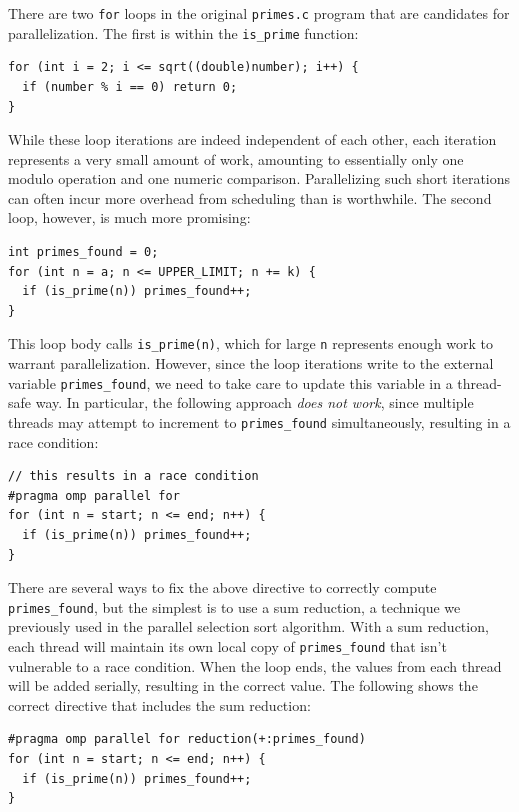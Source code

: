 \documentclass{article}
\theoremstyle{definition}
\begin{document}
There are two \texttt{for} loops in the original \texttt{primes.c} program that are candidates for parallelization. The first is within the \texttt{is\_prime} function:

\begin{verbatim}
for (int i = 2; i <= sqrt((double)number); i++) {
  if (number % i == 0) return 0;
}
\end{verbatim}

While these loop iterations are indeed independent of each other, each iteration represents a very small amount of work, amounting to essentially only one modulo operation and one numeric comparison. Parallelizing such short iterations can often incur more overhead from scheduling than is worthwhile. The second loop, however, is much more promising:

\begin{verbatim}
int primes_found = 0;
for (int n = a; n <= UPPER_LIMIT; n += k) {
  if (is_prime(n)) primes_found++;
}
\end{verbatim}

This loop body calls \texttt{is\_prime(n)}, which for large \texttt{n} represents enough work to warrant parallelization. However, since the loop iterations write to the external variable \texttt{primes\_found}, we need to take care to update this variable in a thread-safe way. In particular, the following approach \emph{does not work}, since multiple threads may attempt to increment to \texttt{primes\_found} simultaneously, resulting in a race condition:

\begin{verbatim}
// this results in a race condition
#pragma omp parallel for
for (int n = start; n <= end; n++) {
  if (is_prime(n)) primes_found++;
}
\end{verbatim}

There are several ways to fix the above directive to correctly compute \texttt{primes\_found}, but the simplest is to use a sum reduction, a technique we previously used in the parallel selection sort algorithm. With a sum reduction, each thread will maintain its own local copy of \texttt{primes\_found} that isn't vulnerable to a race condition. When the loop ends, the values from each thread will be added serially, resulting in the correct value. The following shows the correct directive that includes the sum reduction:

\begin{verbatim}
#pragma omp parallel for reduction(+:primes_found)
for (int n = start; n <= end; n++) {
  if (is_prime(n)) primes_found++;
}
\end{verbatim}
\end{document}
